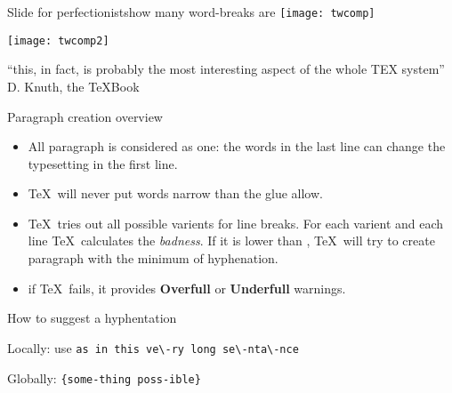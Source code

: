 
\begin{frame}{Slide for perfectionists}{how many word-breaks are}\relax
\centering
\texttt{[image: twcomp]}

\texttt{[image: twcomp2]}

\end{frame}


\begin{frame}\relax
\Huge\centering ``this, in fact, is probably the most interesting aspect of the whole TEX system''\\\hfill \large D. Knuth, the \TeX Book

\end{frame}

\begin{frame}{Paragraph creation overview\preMagicPage}\relax
\begin{itemize}
    \item All paragraph is considered as one: the words in the last line can change the typesetting in the first line.
    \item \TeX\ will never put words narrow than the glue allow.
    \item \TeX\ tries out all possible varients for line breaks. For each varient and each line \TeX\ calculates the \textit{badness}. If it is lower than \ccol\tolerance, \TeX\ will try to create paragraph with the minimum of hyphenation.
    \item if \TeX\ fails, it provides \textbf{Overfull} or \textbf{Underfull} warnings.
\end{itemize}
\end{frame}

\begin{frame}[fragile]{How to suggest a hyphentation\magicPage}\relax

Locally: use \ccol\- \verb|as in this ve\-ry long se\-nta\-nce|

Globally: \ccol\hyphenation\verb|{some-thing poss-ible}|

\cprotect{}
\end{frame}

